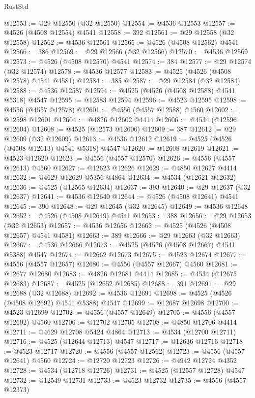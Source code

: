 \begin{lexlean}{RustStd}
\begin{coremodule}
@12553 := @29 @12550 (@32 @12550)
@12554 := @4536 @12553
@12557 := @4526 (@4508 @12554) @4541
@12558 := 392
@12561 := @29 @12558 (@32 @12558)
@12562 := @4536 @12561
@12565 := @4526 (@4508 @12562) @4541
@12566 := 386
@12569 := @29 @12566 (@32 @12566)
@12570 := @4536 @12569
@12573 := @4526 (@4508 @12570) @4541
@12574 := 384
@12577 := @29 @12574 (@32 @12574)
@12578 := @4536 @12577
@12583 := @4525 (@4526 (@4508 @12578) @4541 @4581)
@12584 := 385
@12587 := @29 @12584 (@32 @12584)
@12588 := @4536 @12587
@12594 := @4525 (@4526 (@4508 @12588) @4541 @5318) @4547
@12595 := @12583 @12594
@12596 := @4523 @12595
@12598 := @4556 (@4557 @12578)
@12601 := @4556 (@4557 @12588) @4560
@12602 := @12598 @12601
@12604 := @4826 @12602 @4414
@12606 := @4534 (@12596 @12604)
@12608 := @4525 (@12573 @12606)
@12609 := 387
@12612 := @29 @12609 (@32 @12609)
@12613 := @4536 @12612
@12619 := @4525 (@4526 (@4508 @12613) @4541 @5318) @4547
@12620 := @12608 @12619
@12621 := @4523 @12620
@12623 := @4556 (@4557 @12570)
@12626 := @4556 (@4557 @12613) @4560
@12627 := @12623 @12626
@12629 := @4850 @12627 @4414
@12632 := @4629 @12629 @5356 @4864
@12634 := @4534 (@12621 @12632)
@12636 := @4525 (@12565 @12634)
@12637 := 393
@12640 := @29 @12637 (@32 @12637)
@12641 := @4536 @12640
@12644 := @4526 (@4508 @12641) @4541
@12645 := 390
@12648 := @29 @12645 (@32 @12645)
@12649 := @4536 @12648
@12652 := @4526 (@4508 @12649) @4541
@12653 := 388
@12656 := @29 @12653 (@32 @12653)
@12657 := @4536 @12656
@12662 := @4525 (@4526 (@4508 @12657) @4541 @4581)
@12663 := 389
@12666 := @29 @12663 (@32 @12663)
@12667 := @4536 @12666
@12673 := @4525 (@4526 (@4508 @12667) @4541 @5388) @4547
@12674 := @12662 @12673
@12675 := @4523 @12674
@12677 := @4556 (@4557 @12657)
@12680 := @4556 (@4557 @12667) @4560
@12681 := @12677 @12680
@12683 := @4826 @12681 @4414
@12685 := @4534 (@12675 @12683)
@12687 := @4525 (@12652 @12685)
@12688 := 391
@12691 := @29 @12688 (@32 @12688)
@12692 := @4536 @12691
@12698 := @4525 (@4526 (@4508 @12692) @4541 @5388) @4547
@12699 := @12687 @12698
@12700 := @4523 @12699
@12702 := @4556 (@4557 @12649)
@12705 := @4556 (@4557 @12692) @4560
@12706 := @12702 @12705
@12708 := @4850 @12706 @4414
@12711 := @4629 @12708 @5424 @4864
@12713 := @4534 (@12700 @12711)
@12716 := @4525 (@12644 @12713) @4547
@12717 := @12636 @12716
@12718 := @4523 @12717
@12720 := @4556 (@4557 @12562)
@12723 := @4556 (@4557 @12641) @4560
@12724 := @12720 @12723
@12726 := @4942 @12724 @4352
@12728 := @4534 (@12718 @12726)
@12731 := @4525 (@12557 @12728) @4547
@12732 := @12549 @12731
@12733 := @4523 @12732
@12735 := @4556 (@4557 @12373)

\end{coremodule}
\end{lexlean}
